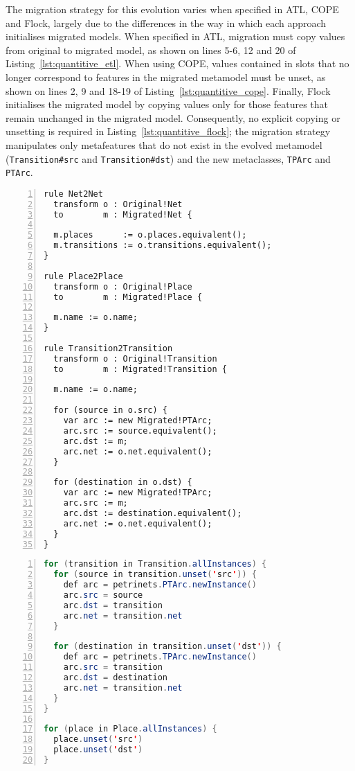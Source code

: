 The migration strategy for this evolution varies when specified in ATL, COPE and Flock, largely due to the differences in the way in which each approach initialises migrated models. When specified in ATL, migration must copy values from original to migrated model, as shown on lines 5-6, 12 and 20 of Listing~\ref{lst:quantitive_etl}. When using COPE, values contained in slots that no longer correspond to features in the migrated metamodel must be unset, as shown on lines 2, 9 and 18-19 of Listing~\ref{lst:quantitive_cope}. Finally, Flock initialises the migrated model by copying values only for those features that remain unchanged in the migrated model. Consequently, no explicit copying or unsetting is required in Listing~\ref{lst:quantitive_flock}; the migration strategy manipulates only metafeatures that do not exist in the evolved metamodel (\texttt{Transition\#src} and \texttt{Transition\#dst}) and the new metaclasses, \texttt{TPArc} and \texttt{PTArc}.

\begin{lstlisting}[basicstyle=\ttfamily\footnotesize, flexiblecolumns=true, numbers=left, nolol=true, caption=Petri nets model migration in ETL, label=lst:quantitive_etl, language=ETL, tabsize=2]
rule Net2Net
  transform o : Original!Net
  to        m : Migrated!Net {

  m.places      := o.places.equivalent();
  m.transitions := o.transitions.equivalent();
}

rule Place2Place
  transform o : Original!Place
  to        m : Migrated!Place {

  m.name := o.name;
}

rule Transition2Transition
  transform o : Original!Transition
  to        m : Migrated!Transition {

  m.name := o.name;

  for (source in o.src) {
    var arc := new Migrated!PTArc;
    arc.src := source.equivalent();
    arc.dst := m;
    arc.net := o.net.equivalent();
  }

  for (destination in o.dst) {
    var arc := new Migrated!TPArc;
    arc.src := m;
    arc.dst := destination.equivalent();
    arc.net := o.net.equivalent();
  }
}
\end{lstlisting}


\begin{lstlisting}[basicstyle=\ttfamily\footnotesize, flexiblecolumns=true, numbers=left, nolol=true, caption=Petri nets model migration in COPE, label=lst:quantitive_cope, language=Java, tabsize=2]
for (transition in Transition.allInstances) {
  for (source in transition.unset('src')) {
    def arc = petrinets.PTArc.newInstance()
    arc.src = source
    arc.dst = transition
    arc.net = transition.net
  }

  for (destination in transition.unset('dst')) {
    def arc = petrinets.TPArc.newInstance() 
    arc.src = transition
    arc.dst = destination
    arc.net = transition.net
  }
}

for (place in Place.allInstances) {
  place.unset('src')
  place.unset('dst')
}
\end{lstlisting}


